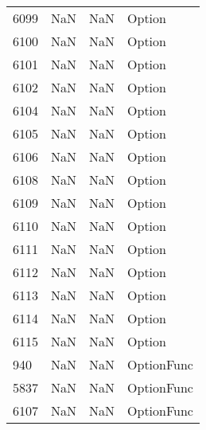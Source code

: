 \begin{tabular}{llll}
6099 &                   NaN &                        NaN &                                    Option \\
6100 &                   NaN &                        NaN &                                    Option \\
6101 &                   NaN &                        NaN &                                    Option \\
6102 &                   NaN &                        NaN &                                    Option \\
6104 &                   NaN &                        NaN &                                    Option \\
6105 &                   NaN &                        NaN &                                    Option \\
6106 &                   NaN &                        NaN &                                    Option \\
6108 &                   NaN &                        NaN &                                    Option \\
6109 &                   NaN &                        NaN &                                    Option \\
6110 &                   NaN &                        NaN &                                    Option \\
6111 &                   NaN &                        NaN &                                    Option \\
6112 &                   NaN &                        NaN &                                    Option \\
6113 &                   NaN &                        NaN &                                    Option \\
6114 &                   NaN &                        NaN &                                    Option \\
6115 &                   NaN &                        NaN &                                    Option \\
940  &                   NaN &                        NaN &                                OptionFunc \\
5837 &                   NaN &                        NaN &                                OptionFunc \\
6107 &                   NaN &                        NaN &                                OptionFunc \\

\end{tabular}
